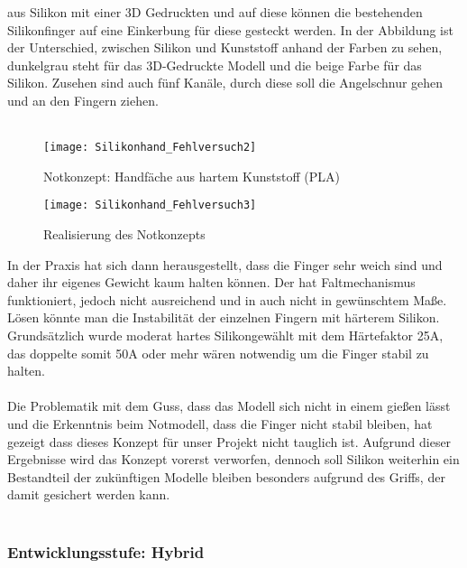 \documentclass[titlepage,12pt,twoside]{article}
\begin{document}
aus Silikon mit einer 3D Gedruckten und auf diese können die bestehenden Silikonfinger auf eine Einkerbung für diese gesteckt werden. In der Abbildung ist der Unterschied, zwischen Silikon und Kunststoff anhand der Farben zu sehen, dunkelgrau steht 
für das 3D-Gedruckte Modell und die beige Farbe für das Silikon. Zusehen sind auch fünf Kanäle, durch diese soll die Angelschnur gehen und an den Fingern ziehen. \\
\\
\begin{figure}[H]
	\begin{center}
		\scalebox{0.8}
		{\texttt{[image: Silikonhand\_Fehlversuch2]}}
		\caption{Notkonzept: Handfäche aus hartem Kunststoff (PLA)}
		\label{fig:Silikonhand_Fehlversuch2}			
	\end{center}
\end{figure}
\begin{figure}[H]
	\begin{center}
		\scalebox{0.8}
		{\texttt{[image: Silikonhand\_Fehlversuch3]}}
		\caption{Realisierung des Notkonzepts}
		\label{fig:Silikonhand_Fehlversuch3}			
	\end{center}
\end{figure}
\hfill \break
In der Praxis hat sich dann herausgestellt, dass die Finger sehr weich sind und daher ihr eigenes Gewicht kaum halten können. Der hat Faltmechanismus funktioniert, jedoch nicht ausreichend und in auch nicht in gewünschtem Maße. Lösen könnte man die 
Instabilität der einzelnen Fingern mit härterem Silikon. Grundsätzlich wurde moderat hartes Silikongewählt mit dem Härtefaktor 25A, das doppelte somit 50A oder mehr wären notwendig um die Finger stabil zu halten. \\
\\
Die Problematik mit dem Guss, dass das Modell sich nicht in einem gießen lässt und die Erkenntnis beim Notmodell, dass die Finger nicht stabil bleiben, hat gezeigt dass dieses Konzept für unser Projekt nicht tauglich ist. Aufgrund dieser 
Ergebnisse wird das Konzept vorerst verworfen, dennoch soll Silikon weiterhin ein Bestandteil der zukünftigen Modelle bleiben besonders aufgrund des Griffs, der damit gesichert werden kann. \\
\\

\subsubsection{Entwicklungsstufe: Hybrid}
\label{chap:Entwicklungsstufe: Hybrid}
\end{document}
